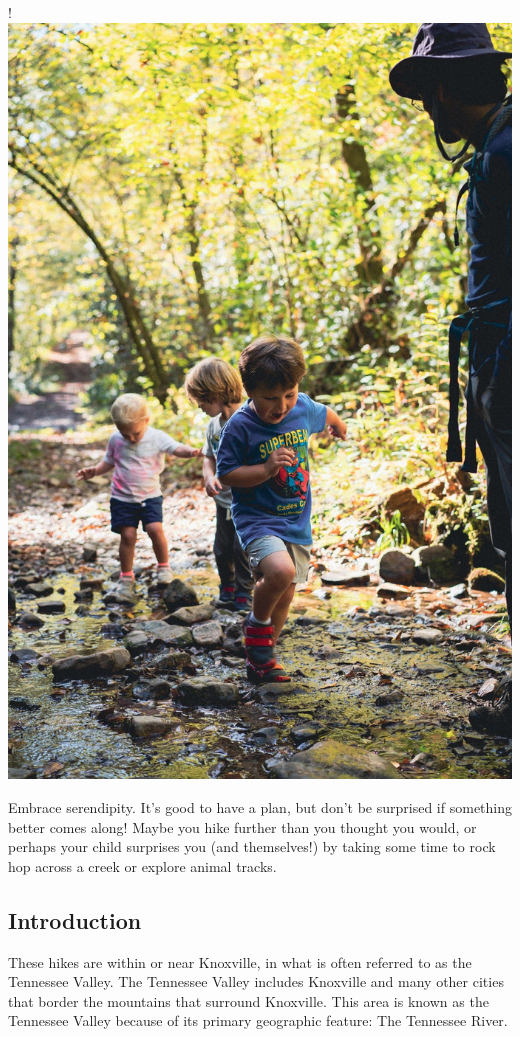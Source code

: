 \documentclass[
  letterpaper,
  DIV=11,
  numbers=noendperiod]{scrartcl}
\begin{document}
!\includegraphics{img/kidscrossingcreek.jpg}

Embrace serendipity. It's good to have a plan, but don't be surprised if
something better comes along! Maybe you hike further than you thought
you would, or perhaps your child surprises you (and themselves!) by
taking some time to rock hop across a creek or explore animal tracks.

\hypertarget{introduction}{%
\subsection{Introduction}\label{introduction}}

These hikes are within or near Knoxville, in what is often referred to
as the Tennessee Valley. The Tennessee Valley includes Knoxville and
many other cities that border the mountains that surround Knoxville.
This area is known as the Tennessee Valley because of its primary
geographic feature: The Tennessee River.
\end{document}
